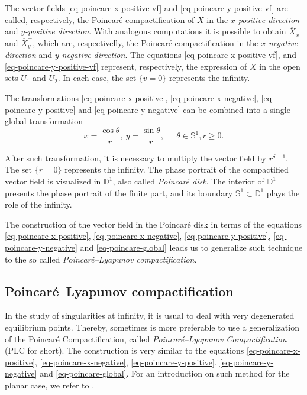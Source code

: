 \documentclass[12pt]{amsart}
\begin{document}
The vector fields \eqref{eq-poincare-x-positive-vf} and \eqref{eq-poincare-y-positive-vf} are called, respectively, the Poincaré compactification of $X$ in the \emph{$x$-positive direction} and \emph{$y$-positive direction}. With analogous computations it is possible to obtain $\overline{X}^{-}_{x}$ and $\overline{X}^{-}_{y}$, which are, respectivelly, the Poincaré compactification in the \emph{$x$-negative direction} and \emph{$y$-negative direction}. The equations \eqref{eq-poincare-x-positive-vf}, and \eqref{eq-poincare-y-positive-vf} represent, respectively, the expression of $X$ in the open sets $U_{1}$ and $U_{2}$. In each case, the set $\{v = 0\}$ represents the infinity.

The transformations \eqref{eq-poincare-x-positive}, \eqref{eq-poincare-x-negative}, \eqref{eq-poincare-y-positive} and \eqref{eq-poincare-y-negative} can be combined into a single global transformation
\begin{equation}\label{eq-poincare-global}
x = \displaystyle\frac{\cos\theta}{r}, \ y = \displaystyle\frac{\sin\theta}{r}, \ \quad \ \theta\in\mathbb{S}^{1}, r\geq 0.
\end{equation}

After such transformation, it is necessary to multiply the vector field by $r^{\delta-1}$. The set $\{r = 0\}$ represents the infinity. The phase portrait of the compactified vector field is visualized in $\mathbb{D}^{1}$, also called \emph{Poincaré disk}. The interior of $\mathbb{D}^{1}$ presents the phase portrait of the finite part, and its boundary $\mathbb{S}^{1}\subset \mathbb{D}^{1}$ plays the role of the infinity.

The construction of the vector field in the Poincaré disk in terms of the equations \eqref{eq-poincare-x-positive}, \eqref{eq-poincare-x-negative}, \eqref{eq-poincare-y-positive}, \eqref{eq-poincare-y-negative} and \eqref{eq-poincare-global} leads us to generalize such technique to the so called \emph{Poincaré--Lyapunov compactification}.

\subsection{Poincaré--Lyapunov compactification}

In the study of singularities at infinity, it is usual to deal with very degenerated equilibrium points. Thereby, sometimes is more preferable to use a generalization of the Poincaré Compactification, called \emph{Poincaré--Lyapunov Compactification} (PLC for short). The construction is very similar to the equations \eqref{eq-poincare-x-positive}, \eqref{eq-poincare-x-negative}, \eqref{eq-poincare-y-positive}, \eqref{eq-poincare-y-negative} and \eqref{eq-poincare-global}. For an introduction on such method for the planar case, we refer to \cite[Chapters 5 and 9]{DumortierLlibreArtes}.
\end{document}
